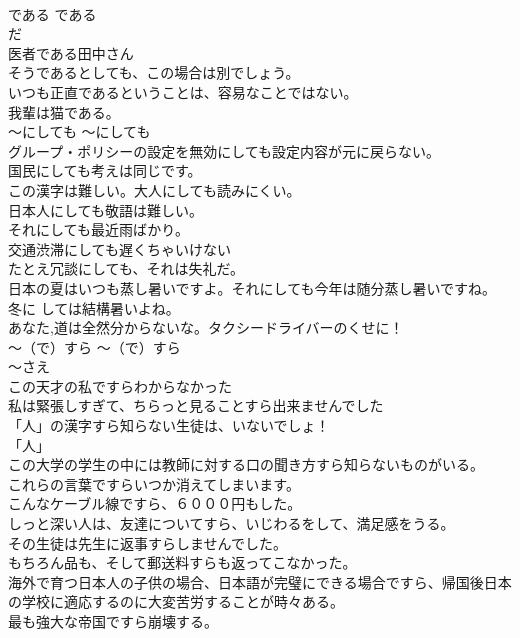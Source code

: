 \documentclass[8pt]{extreport}
\begin{document}
\begin{CJK}{UTF8}{min}
\\	である	である	
\\	だ 
\\	医者である田中さん  
\\	そうであるとしても、この場合は別でしょう。  
\\	いつも正直であるということは、容易なことではない。  
\\	我輩は猫である。 
\\	〜にしても	〜にしても	
\\	グループ・ポリシーの設定を無効にしても設定内容が元に戻らない。  
\\	国民にしても考えは同じです。  
\\	この漢字は難しい。大人にしても読みにくい。  
\\	日本人にしても敬語は難しい。  
\\	それにしても最近雨ばかり。  
\\	交通渋滞にしても遅くちゃいけない   
\\	たとえ冗談にしても、それは失礼だ。  
\\	日本の夏はいつも蒸し暑いですよ。それにしても今年は随分蒸し暑いですね。  
\\	冬に しては結構暑いよね。  
\\	あなた,道は全然分からないな。タクシードライバーのくせに！  
\\	〜（で）すら	〜（で）すら	
\\	〜さえ	
\\	この天才の私ですらわからなかった  
\\	私は緊張しすぎて、ちらっと見ることすら出来ませんでした   
\\	「人」の漢字すら知らない生徒は、いないでしょ！  
\\	「人」 
\\	この大学の学生の中には教師に対する口の聞き方すら知らないものがいる。   
\\	これらの言葉ですらいつか消えてしまいます。   
\\	こんなケーブル線ですら、６０００円もした。   
\\	しっと深い人は、友達についてすら、いじわるをして、満足感をうる。   
\\	その生徒は先生に返事すらしませんでした。   
\\	もちろん品も、そして郵送料すらも返ってこなかった。   
\\	海外で育つ日本人の子供の場合、日本語が完璧にできる場合ですら、帰国後日本の学校に適応するのに大変苦労することが時々ある。   
\\	最も強大な帝国ですら崩壊する。   

\end{CJK}
\end{document}
